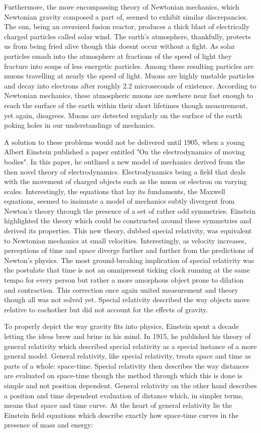 \documentclass{article}
\begin{document}
  Furthermore, the more encompassing theory of Newtonian mechanics, which Newtonian gravity composed a part of, seemed to exhibit similar discrepancies. The sun, being an oversized fusion reactor, produces a thick blast of electrically charged particles called solar wind. The earth's atmosphere, thankfully, protects us from being fried alive though this doesnt occur without a fight. As solar particles smash into the atmosphere at fractions of the speed of light they fracture into soups of less energetic particles. Among these resulting particles are muons travelling at nearly the speed of light. Muons are highly unstable particles and decay into electrons after roughly 2.2 microseconds of existence. According to Newtonian mechanics, these atmospheric muons are nowhere near fast enough to reach the surface of the earth within their short lifetimes though measurement, yet again, disagrees. Muons are detected regularly on the surface of the earth poking holes in our understandings of mechanics. 

  A solution to these problems would not be delivered until 1905, when a young Albert Einstein published a paper entitled "On the electrodynamics of moving bodies". In this paper, he outlined a new model of mechanics derived from the then novel theory of electrodynamics. Electrodynamics being a field that deals with the movement of charged objects such as the muon or electron on varying scales. Interestingly, the equations that lay its fundaments, the Maxwell equations, seemed to insinuate a model of mechanics subtly divergent from Newton's theory through the presence of a set of rather odd symmetries. Einstein highlighted the theory which could be constructed around these symmetries and derived its properties. This new theory, dubbed special relativity, was equivalent to Newtonian mechanics at small velocities. Interestingly, as velocity increases, perceptions of time and space diverge further and further from the predictions of Newton's physics. The most ground-breaking implication of special relativity was the postulate that time is not an omnipresent ticking clock running at the same tempo for every person but rather a more amorphous object prone to dilation and contraction. This correction once again united measurement and theory though all was not solved yet. Special relativity described the way objects move relative to eachother but did not account for the effects of gravity.

  To properly depict the way gravity fits into physics, Einstein spent a decade letting the ideas brew and brine in his mind. In 1915, he published his theory of general relativity which described special relativity as a special instance of a more general model. General relativity, like special relativity, treats space and time as parts of a whole: space-time. Special relativity then describes the way distances are evaluated on space-time though the method through which this is done is simple and not position dependent. General relativity on the other hand describes a position and time dependent evaluation of distance which, in simpler terms, means that space and time curve. At the heart of general relativity lie the Einstein field equations which describe exactly how space-time curves in the presence of mass and energy:
\end{document}
